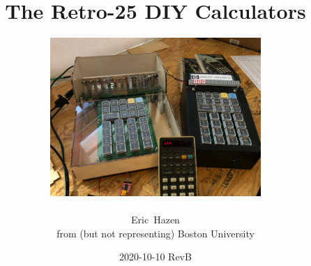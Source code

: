 \documentclass{beamer}
\newcommand{\tblue}[1]{\textcolor{my-blue}{#1}}
\begin{document}
\hypersetup{urlcolor=my-blue}




\title{The Retro-25 DIY Calculators}
\date{2020-10-10 RevB}
\author
{
  \begin{center}
    \includegraphics[width=0.6\textwidth]{figs/all3_800.jpg} \\
   \end{center}
\scriptsize
 Eric~Hazen \\
\tblue{from (but not representing) Boston University}
}

\newcommand{\spage}[1]{
\begin{frame}
  \begin{tikzpicture}[remember picture, overlay]
  \node[anchor=north]at(current page.north){
     \texttt{[image: \#1]}
  };
  \end{tikzpicture}
\end{frame}
}
\frame{\titlepage}
\end{document}
